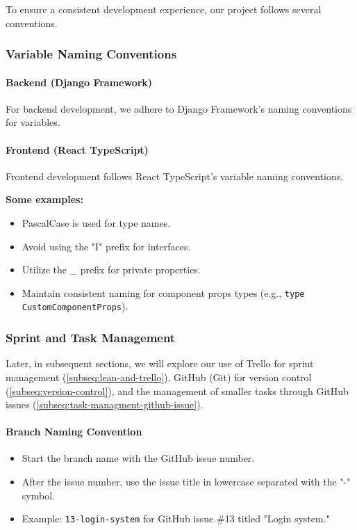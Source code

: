 \documentclass[12pt,a4paper]{article}
\begin{document}
\begin{spacing}{1.5}
    To ensure a consistent development experience, our project follows several
    conventions.

    \subsubsection{Variable Naming Conventions}

    \paragraph{Backend (Django Framework)}
    For backend development, we adhere to Django Framework's naming conventions for
    variables.

    \paragraph{Frontend (React TypeScript)}
    Frontend development follows React TypeScript's variable naming conventions.

    \textbf{Some examples:}
    \begin{itemize}
        \item PascalCase is used for type names.
        \item Avoid using the "I" prefix for interfaces.
        \item Utilize the \_ prefix for private properties.
        \item Maintain consistent naming for component props types (e.g., \texttt{type
                  CustomComponentProps}).
    \end{itemize}

    \subsubsection{Sprint and Task Management}\label{subseq:conventions-sprint-and-task-managment}

    Later, in subsequent sections, we will explore our use of Trello for sprint
    management (\autoref{subseq:lean-and-trello}), GitHub (Git) for version control
    (\autoref{subseq:version-control}), and the management of smaller tasks through
    GitHub issues (\autoref{subseq:task-managment-github-issue}).

    \paragraph{Branch Naming Convention}
    \begin{itemize}
        \item Start the branch name with the GitHub issue number.
        \item After the issue number, use the issue title in lowercase separated with the "-"
              symbol.
        \item Example: \texttt{13-login-system} for GitHub issue \#13 titled "Login system."
    \end{itemize}


\end{spacing}
\end{document}
